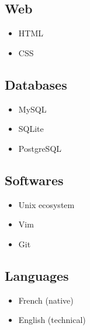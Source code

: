 \documentclass[a4paper]{article}
\begin{document}
\subsection*{Web}

\begin{itemize}
  \item HTML
  \item CSS
\end{itemize}

\subsection*{Databases}

\begin{itemize}
  \item MySQL
  \item SQLite
  \item PostgreSQL
\end{itemize}

\subsection*{Softwares}

\begin{itemize}
  \item Unix ecosystem
  \item Vim
  \item Git
\end{itemize}

\subsection*{Languages}

\begin{itemize}
  \item French (native)
  \item English (technical)
\end{itemize}
\end{document}
